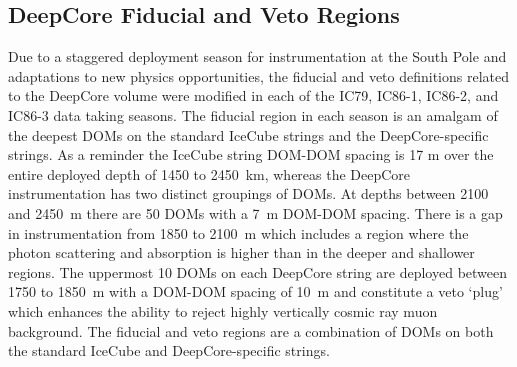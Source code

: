 \documentclass[../Main.tex]{subfiles}
\begin{document}
\subsection{DeepCore Fiducial and Veto
  Regions}\label{sec:FiducialVetoRegions}

Due to a staggered deployment season for instrumentation at the South
Pole and adaptations to new physics opportunities, the fiducial and
veto definitions related to the DeepCore volume were modified in each
of the IC79, IC86-1, IC86-2, and IC86-3 data taking seasons. The
fiducial region in each season is an amalgam of the deepest DOMs on
the standard IceCube strings and the DeepCore-specific strings. As a reminder
the IceCube string DOM-DOM spacing is 17 m over the entire deployed
depth of 1450 to 2450~km, whereas the DeepCore instrumentation has
two distinct groupings of DOMs. At depths between 2100 and 2450~m
there are 50 DOMs with a 7~m DOM-DOM spacing. There is a gap in
instrumentation from 1850 to 2100~m which includes a region where the photon scattering and
absorption is higher than in the deeper and shallower
regions. The uppermost 10 DOMs on each DeepCore string are deployed
between 1750 to 1850~m with a DOM-DOM spacing of 10~m and constitute a
veto `plug' which enhances the ability to reject highly vertically
cosmic ray muon background. The fiducial and veto regions are a
combination of DOMs on both the standard IceCube and DeepCore-specific
strings.
\end{document}
